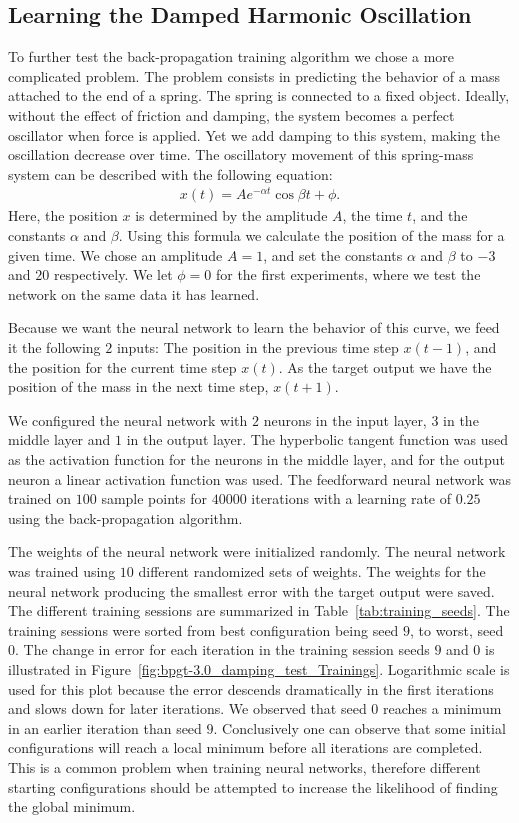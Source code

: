 \documentclass[11pt]{article}
\begin{document}
\subsection{Learning the Damped Harmonic Oscillation} %
\label{sub:a_more_complex_problem}
To further test the back-propagation training algorithm we chose a more complicated problem. The problem consists in predicting the
behavior of a mass attached to the end of a spring. The spring is connected to a fixed object. Ideally, without the effect of friction
and damping, the system becomes a perfect oscillator when force is applied. Yet we add damping to this system, making the oscillation
decrease over time. The oscillatory movement of this spring-mass system can be described with the following equation:
\begin{eqnarray}\label{eqn:damping}
	x(t) = Ae^{-\alpha t}\cos{\beta t+\phi}.
\end{eqnarray}
Here, the position $x$ is determined by the amplitude $A$, the time $t$, and the constants $\alpha$ and $\beta$. Using this formula we
calculate the position of the mass for a given time. We chose an amplitude $A=1$, and set the constants $\alpha$ and $\beta$ to $-3$
and $20$ respectively. We let $\phi=0$ for the first experiments, where we test the network on the same data it has learned.

Because we want the neural network to learn the behavior of this curve, we feed it the following $2$ inputs: The position in the
previous time step $x(t-1)$, and the position for the current time step $x(t)$. As the target output we have the position of the mass in
the next time step, $x(t+1)$.

We configured the neural network with $2$ neurons in the input layer, $3$ in the middle layer and $1$ in the output layer. The
hyperbolic tangent function was used as the activation function for the neurons in the middle layer, and for the output neuron a linear
activation function was used. The feedforward neural network was trained on $100$ sample points for $40000$ iterations with a learning
rate of $0.25$ using the back-propagation algorithm.

The weights of the neural network were initialized randomly. The neural network was trained using $10$ different randomized sets of
weights. The weights for the neural network producing the smallest error with the target output were saved. The different training
sessions are summarized in Table~\ref{tab:training_seeds}. The training sessions were sorted from best configuration being seed $9$, to
worst, seed $0$. The change in error for each iteration in the training session seeds $9$ and $0$ is illustrated in
Figure~\ref{fig:bpgt-3.0_damping_test_Trainings}. Logarithmic scale is used for this plot because the error descends dramatically in the
first iterations and slows down for later iterations. We observed that seed $0$ reaches a minimum in an earlier iteration than seed $9$.
Conclusively one can observe that some initial configurations will reach a local minimum before all iterations are completed. This is a
common problem when training neural networks, therefore different starting configurations should be attempted to increase the likelihood
of finding the global minimum.
\end{document}
